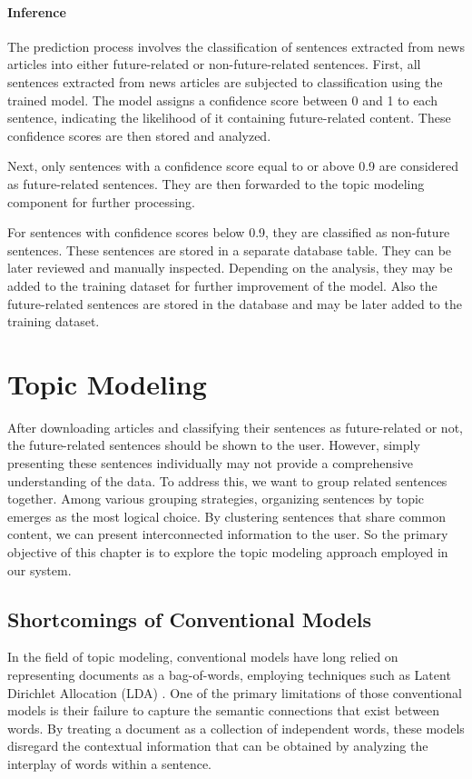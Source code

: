 \documentclass[12pt,oneside,bibtotoc,liststotoc]{scrbook}
\begin{document}
\subsubsection{Inference}
The prediction process involves the classification of sentences extracted from news articles into either future-related or non-future-related sentences.
First, all sentences extracted from news articles are subjected to classification using the trained model. The model assigns a confidence score between 0 and 1 to each sentence, indicating the likelihood of it containing future-related content. These confidence scores are then stored and analyzed.

Next, only sentences with a confidence score equal to or above 0.9 are considered as future-related sentences. They are then forwarded to the topic modeling component for further processing.

For sentences with confidence scores below 0.9, they are classified as non-future sentences. These sentences are stored in a separate database table. They can be later reviewed and manually inspected. Depending on the analysis, they may be added to the training dataset for further improvement of the model.
Also the future-related sentences are stored in the database and may be later added to the training dataset.

\chapter{Topic Modeling}
After downloading articles and classifying their sentences as future-related or not, the future-related sentences should be shown to the user. However, simply presenting these sentences individually may not provide a comprehensive understanding of the data. To address this, we want to group related sentences together. Among various grouping strategies, organizing sentences by topic emerges as the most logical choice. By clustering sentences that share common content, we can present interconnected information to the user.
So the primary objective of this chapter is to explore the topic modeling approach employed in our system.




\section{Shortcomings of Conventional Models}
In the field of topic modeling, conventional models have long relied on representing documents as a bag-of-words, employing techniques such as Latent Dirichlet Allocation (LDA) \cite{BleiLDA}. One of the primary limitations of those conventional models is their failure to capture the semantic connections that exist between words. By treating a document as a collection of independent words, these models disregard the contextual information that can be obtained by analyzing the interplay of words within a sentence.
\end{document}
